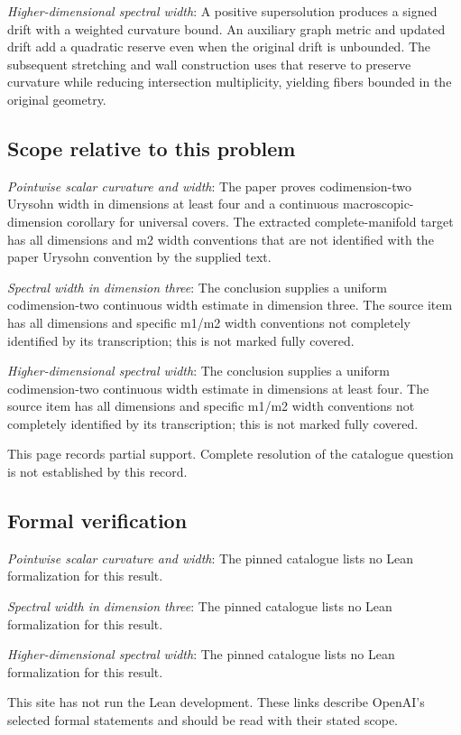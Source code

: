 \documentclass[11pt]{article}
\begin{document}
\textit{Higher-dimensional spectral width}: A positive supersolution produces a signed drift with a weighted curvature bound. An auxiliary graph metric and updated drift add a quadratic reserve even when the original drift is unbounded. The subsequent stretching and wall construction uses that reserve to preserve curvature while reducing intersection multiplicity, yielding fibers bounded in the original geometry.

\subsection{Scope relative to this problem}
\textit{Pointwise scalar curvature and width}: The paper proves codimension-two Urysohn width in dimensions at least four and a continuous macroscopic-dimension corollary for universal covers. The extracted complete-manifold target has all dimensions and m2 width conventions that are not identified with the paper Urysohn convention by the supplied text.

\textit{Spectral width in dimension three}: The conclusion supplies a uniform codimension-two continuous width estimate in dimension three. The source item has all dimensions and specific m1/m2 width conventions not completely identified by its transcription; this is not marked fully covered.

\textit{Higher-dimensional spectral width}: The conclusion supplies a uniform codimension-two continuous width estimate in dimensions at least four. The source item has all dimensions and specific m1/m2 width conventions not completely identified by its transcription; this is not marked fully covered.

This page records partial support. Complete resolution of the catalogue question is not established by this record.

\subsection{Formal verification}
\textit{Pointwise scalar curvature and width}: The pinned catalogue lists no Lean formalization for this result.

\textit{Spectral width in dimension three}: The pinned catalogue lists no Lean formalization for this result.

\textit{Higher-dimensional spectral width}: The pinned catalogue lists no Lean formalization for this result.

This site has not run the Lean development. These links describe OpenAI’s selected formal statements and should be read with their stated scope.
\end{document}
